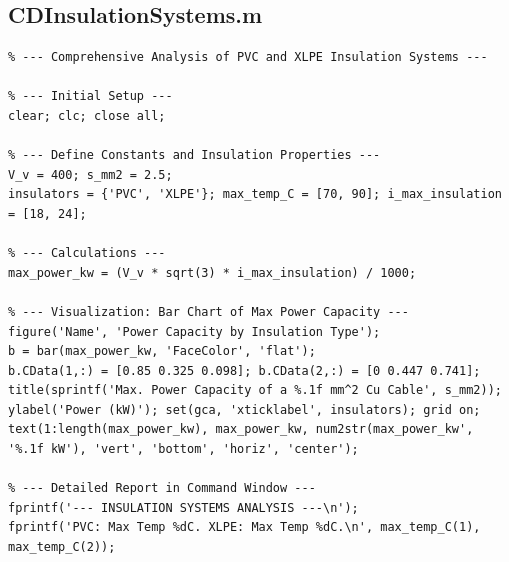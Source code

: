 \documentclass[12pt, a4paper]{article}
\begin{document}
\subsection{CDInsulationSystems.m}
\begin{lstlisting}
% --- Comprehensive Analysis of PVC and XLPE Insulation Systems ---

% --- Initial Setup ---
clear; clc; close all;

% --- Define Constants and Insulation Properties ---
V_v = 400; s_mm2 = 2.5;
insulators = {'PVC', 'XLPE'}; max_temp_C = [70, 90]; i_max_insulation = [18, 24];

% --- Calculations ---
max_power_kw = (V_v * sqrt(3) * i_max_insulation) / 1000;

% --- Visualization: Bar Chart of Max Power Capacity ---
figure('Name', 'Power Capacity by Insulation Type');
b = bar(max_power_kw, 'FaceColor', 'flat');
b.CData(1,:) = [0.85 0.325 0.098]; b.CData(2,:) = [0 0.447 0.741];
title(sprintf('Max. Power Capacity of a %.1f mm^2 Cu Cable', s_mm2));
ylabel('Power (kW)'); set(gca, 'xticklabel', insulators); grid on;
text(1:length(max_power_kw), max_power_kw, num2str(max_power_kw', '%.1f kW'), 'vert', 'bottom', 'horiz', 'center');

% --- Detailed Report in Command Window ---
fprintf('--- INSULATION SYSTEMS ANALYSIS ---\n');
fprintf('PVC: Max Temp %dC. XLPE: Max Temp %dC.\n', max_temp_C(1), max_temp_C(2));
\end{lstlisting}
\end{document}
